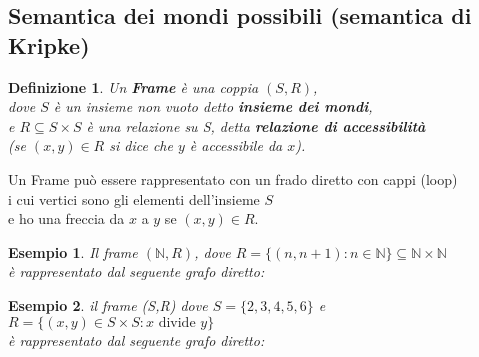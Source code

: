 \documentclass[a4paper,12pt]{article}
\theoremstyle{def}
\newtheorem*{definition}{Definizione}
\theoremstyle{prop}
\theoremstyle{esempio}
\newtheorem*{example}{Esempio}
\theoremstyle{dimostrazione}
\theoremstyle{teo}
\theoremstyle{osservazione}
\begin{document}
\subsection{Semantica dei mondi possibili (semantica di Kripke)}
\begin{definition}
	Un \textbf{Frame} è una coppia \((S,R)\),\\
	dove \(S\) è un insieme non vuoto detto \textbf{insieme dei mondi},\\
	e \(R \subseteq S \times S\) è una relazione su S, detta \textbf{relazione di accessibilità}\\
	(se \((x,y) \in R\) si dice che \(y\) è accessibile da \(x\)).\\
\end{definition}
Un Frame può essere rappresentato con un frado diretto con cappi (loop)\\
i cui vertici sono gli elementi dell'insieme \(S\)\\
e ho una freccia da \(x\) a \(y\) se \((x,y) \in R\).
\begin{example}
	Il frame \((\mathbb{N},R)\), dove \(R = \{(n,n+1) : n \in \mathbb{N}\} \subseteq \mathbb{N} \times \mathbb{N}\)\\
	è rappresentato dal seguente grafo diretto:
	\begin{center}
	\end{center}
\end{example}
\begin{example}
	il frame (S,R) dove \(S = \{2,3,4,5,6\}\) e \(R=\{(x,y) \in S \times S : x \text{ divide } y \}\)\\
	è rappresentato dal seguente grafo diretto:
	\begin{center}
	\end{center}
\end{example}
\end{document}
